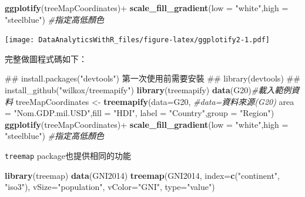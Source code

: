 \documentclass[]{book}
\newenvironment{Shaded}{\begin{snugshade}}{\end{snugshade}}
\newcommand{\KeywordTok}[1]{\textcolor[rgb]{0.13,0.29,0.53}{\textbf{{#1}}}}
\newcommand{\DataTypeTok}[1]{\textcolor[rgb]{0.13,0.29,0.53}{{#1}}}
\newcommand{\StringTok}[1]{\textcolor[rgb]{0.31,0.60,0.02}{{#1}}}
\newcommand{\CommentTok}[1]{\textcolor[rgb]{0.56,0.35,0.01}{\textit{{#1}}}}
\newcommand{\NormalTok}[1]{{#1}}
\theoremstyle{definition}
\theoremstyle{definition}
\theoremstyle{remark}
\begin{document}
\begin{Shaded}
\begin{Highlighting}[]
\KeywordTok{ggplotify}\NormalTok{(treeMapCoordinates)+}\StringTok{ }
\StringTok{    }\KeywordTok{scale_fill_gradient}\NormalTok{(}\DataTypeTok{low =} \StringTok{"white"}\NormalTok{,}\DataTypeTok{high =} \StringTok{"steelblue"}\NormalTok{) }\CommentTok{#指定高低顏色}
\end{Highlighting}
\end{Shaded}

\texttt{[image: DataAnalyticsWithR\_files/figure-latex/ggplotify2-1.pdf]}

完整做圖程式碼如下：

\begin{Shaded}
\begin{Highlighting}[]
\NormalTok{## install.packages("devtools") 第一次使用前需要安裝}
\NormalTok{## library(devtools)}
\NormalTok{## install_github("wilkox/treemapify") }
\KeywordTok{library}\NormalTok{(treemapify)}
\KeywordTok{data}\NormalTok{(G20)}\CommentTok{#載入範例資料}
\NormalTok{treeMapCoordinates <-}\StringTok{ }\KeywordTok{treemapify}\NormalTok{(}\DataTypeTok{data=}\NormalTok{G20, }\CommentTok{#data=資料來源(G20)}
    \DataTypeTok{area =} \StringTok{"Nom.GDP.mil.USD"}\NormalTok{,}\DataTypeTok{fill =} \StringTok{"HDI"}\NormalTok{,}
    \DataTypeTok{label =} \StringTok{"Country"}\NormalTok{,}\DataTypeTok{group =} \StringTok{"Region"}\NormalTok{)}
\KeywordTok{ggplotify}\NormalTok{(treeMapCoordinates)+}\StringTok{ }
\StringTok{    }\KeywordTok{scale_fill_gradient}\NormalTok{(}\DataTypeTok{low =} \StringTok{"white"}\NormalTok{,}\DataTypeTok{high =} \StringTok{"steelblue"}\NormalTok{) }\CommentTok{#指定高低顏色}
\end{Highlighting}
\end{Shaded}

\texttt{treemap}\citep{R-treemap} package也提供相同的功能

\begin{Shaded}
\begin{Highlighting}[]
\KeywordTok{library}\NormalTok{(treemap)}
\KeywordTok{data}\NormalTok{(GNI2014)}
\KeywordTok{treemap}\NormalTok{(GNI2014,}
       \DataTypeTok{index=}\KeywordTok{c}\NormalTok{(}\StringTok{"continent"}\NormalTok{, }\StringTok{"iso3"}\NormalTok{),}
       \DataTypeTok{vSize=}\StringTok{"population"}\NormalTok{,}
       \DataTypeTok{vColor=}\StringTok{"GNI"}\NormalTok{,}
       \DataTypeTok{type=}\StringTok{"value"}\NormalTok{)}
\end{Highlighting}
\end{Shaded}
\end{document}
